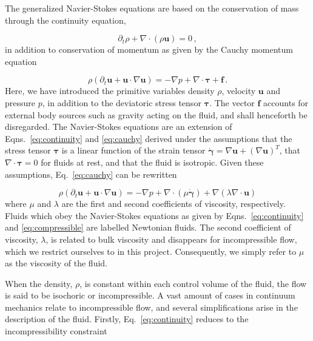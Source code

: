 \documentclass[final,3p,twocolumn]{elsarticle}
\begin{document}
The generalized Navier-Stokes equations are based on the conservation of mass
through the continuity equation,

\begin{equation}
    \partial_t \rho + \nabla \cdot (\rho {\bm u}) = 0 \,,
    \label{eq:continuity}
\end{equation}
%
in addition to conservation of momentum as given by the Cauchy momentum equation

\begin{equation}
    \rho \left( \partial_t \bm{u} + \bm{u} \cdot \nabla \bm{u} \right) 
    = - \nabla p + \nabla \cdot \bm{\tau} + \bm{f} \,.
    \label{eq:cauchy}
\end{equation}
%
Here, we have introduced the primitive variables density $\rho$, velocity
$\bm{u}$ and pressure $p$, in addition to the deviatoric stress tensor
$\bm{\tau}$. The vector $\bm{f}$ accounts for external body sources such as
gravity acting on the fluid, and shall henceforth be disregarded. The
Navier-Stokes equations are an extension of Eqns.\ \eqref{eq:continuity} and
\eqref{eq:cauchy} derived under the assumptions that the stress tensor
$\bm{\tau}$ is a linear function of the strain tensor $\dot{\bm{\gamma}}=\nabla
\bm{u} + (\nabla \bm{u})^T$, that $\nabla \cdot \bm{\tau} = 0$ for fluids at
rest, and that the fluid is isotropic. Given these assumptions, Eq.\
\eqref{eq:cauchy} can be rewritten

\begin{equation}
    \rho \left( \partial_t \bm{u} + \bm{u} \cdot \nabla \bm{u} \right) 
    = - \nabla p + \nabla \cdot \left( \mu \dot{\bm{\gamma}} \right) + \nabla
    \left( \lambda \nabla \cdot \bm{u} \right)
    \label{eq:compressible}
\end{equation}
%
where $\mu$ and $\lambda$ are the first and second coefficients of viscosity,
respectively. Fluids which obey the Navier-Stokes equations as given by Eqns.\
\eqref{eq:continuity} and \eqref{eq:compressible} are labelled Newtonian
fluids.  The second coefficient of viscosity, $\lambda$, is related to bulk
viscosity and disappears for incompressible flow, which we restrict ourselves
to in this project. Consequently, we simply refer to $\mu$ as the
viscosity of the fluid. 

When the density, $\rho$, is constant within each control volume of the fluid,
the flow is said to be isochoric or incompressible. A vast amount of cases in
continuum mechanics relate to incompressible flow, and several simplifications
arise in the description of the fluid. Firstly, Eq.\ \eqref{eq:continuity}
reduces to the incompressibility constraint
\end{document}
